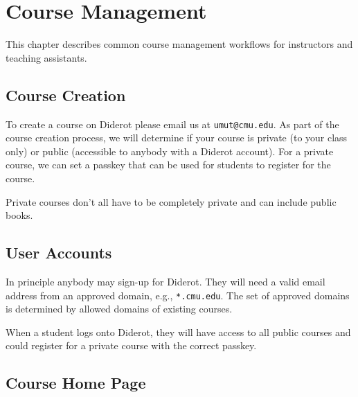 \chapter{Course Management}
\label{ch:guide}

\begin{preamble}
This chapter describes common course management workflows for instructors and teaching assistants.
\end{preamble}

\section{Course Creation}

To create a course on Diderot please email us at \lstinline`umut@cmu.edu`.
%
As part of the course creation process, we will determine if your course is private (to your class only) or public (accessible to anybody with a Diderot account).
%
For a private course, we can set a passkey that can be used for students to register for the course.
%

Private courses don't all have to be completely private and can include public books.  

\section{User Accounts}
In principle anybody may sign-up for Diderot.  
%
They will need a valid email address from an approved domain, e.g.,
\lstinline`*.cmu.edu`.
%
The set of approved domains is determined by allowed domains of existing courses.
%

When a student logs onto Diderot, they will have access to all public
courses and could register for a private course with the correct
passkey.
%


\section{Course Home Page}

